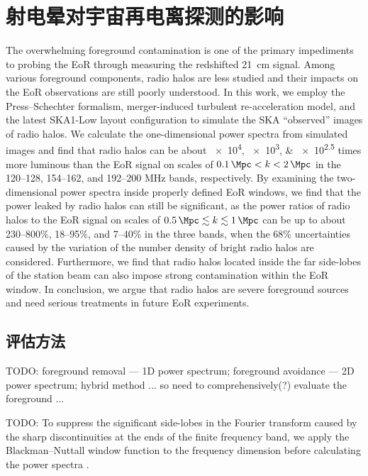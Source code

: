 
\chapter{射电晕对宇宙再电离探测的影响}
\label{chap:halo}

The overwhelming foreground contamination is one of the primary impediments
to probing the EoR through measuring the redshifted 21~cm signal.
Among various foreground components, radio halos are less studied and
their impacts on the EoR observations are still poorly understood.
In this work, we employ the Press--Schechter formalism, merger-induced
turbulent re-acceleration model, and the latest SKA1-Low layout
configuration to simulate the SKA \enquote{observed} images of radio halos.
We calculate the one-dimensional power spectra from simulated images and
find that radio halos can be about
\numlist{e4; e3; e2.5} times more luminous
than the EoR signal on scales of $\SI{0.1}{\per\Mpc} < k < \SI{2}{\per\Mpc}$
in the \numrange{120}{128}, \numrange{154}{162}, and \numrange{192}{200}
\si{\MHz} bands, respectively.
By examining the two-dimensional power spectra inside properly defined
EoR windows, we find that the power leaked by radio halos can still be
significant, as the power ratios of radio halos to the EoR signal on scales
of $\SI{0.5}{\per\Mpc} \lesssim k \lesssim \SI{1}{\per\Mpc}$ can be up to
about \numrange{230}{800}\%, \numrange{18}{95}\%, and \numrange{7}{40}\%
in the three bands, when the 68\% uncertainties caused by
the variation of the number density of bright radio halos are considered.
Furthermore, we find that radio halos located inside the far side-lobes
of the station beam can also impose strong contamination within the EoR
window.
In conclusion, we argue that radio halos are severe foreground sources
and need serious treatments in future EoR experiments.


\section{评估方法}

TODO:
foreground removal --- 1D power spectrum;
foreground avoidance --- 2D power spectrum;
hybrid method ...
so need to comprehensively(?) evaluate the foreground ...

TODO:
To suppress the significant side-lobes in the Fourier transform caused
by the sharp discontinuities at the ends of the finite frequency band,
we apply the Blackman--Nuttall window function to the frequency dimension
before calculating the power spectra \cite{trott2015,chapman2016}.

